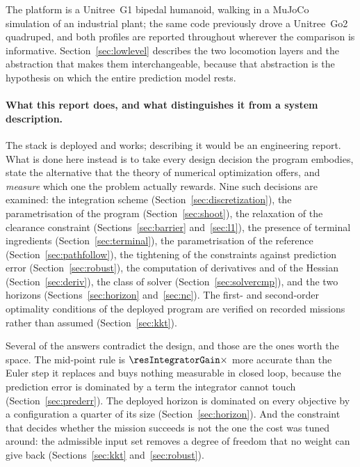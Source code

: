 \documentclass[11pt,a4paper]{article}
\begin{document}
The platform is a Unitree~G1 bipedal humanoid, walking in a MuJoCo simulation of an industrial plant; the same
code previously drove a Unitree~Go2 quadruped, and both profiles are reported throughout wherever the
comparison is informative. Section~\ref{sec:lowlevel} describes the two locomotion layers and the abstraction
that makes them interchangeable, because that abstraction is the hypothesis on which the entire prediction
model rests.

\paragraph{What this report does, and what distinguishes it from a system description.}
The stack is deployed and works; describing it would be an engineering report. What is done here instead is
to take every design decision the program embodies, state the alternative that the theory of numerical
optimization offers, and \emph{measure} which one the problem actually rewards. Nine such decisions are
examined: the integration scheme (Section~\ref{sec:discretization}), the parametrisation of the program
(Section~\ref{sec:shoot}), the relaxation of the clearance constraint (Sections~\ref{sec:barrier}
and~\ref{sec:l1}), the presence of terminal ingredients (Section~\ref{sec:terminal}), the parametrisation of
the reference (Section~\ref{sec:pathfollow}), the tightening of the constraints against prediction error
(Section~\ref{sec:robust}), the computation of derivatives and of the Hessian (Section~\ref{sec:deriv}), the
class of solver (Section~\ref{sec:solvercmp}), and the two horizons (Sections~\ref{sec:horizon}
and~\ref{sec:nc}). The first- and second-order optimality conditions of the deployed program are verified on
recorded missions rather than assumed (Section~\ref{sec:kkt}).

Several of the answers contradict the design, and those are the ones worth the space. The mid-point rule is
$\resIntegratorGain\times$ more accurate than the Euler step it replaces and buys nothing measurable in
closed loop, because the prediction error is dominated by a term the integrator cannot touch
(Section~\ref{sec:prederr}). The deployed horizon is dominated on every objective by a configuration a
quarter of its size (Section~\ref{sec:horizon}). And the constraint that decides whether the mission succeeds
is not the one the cost was tuned around: the admissible input set removes a degree of freedom that no
weight can give back (Sections~\ref{sec:kkt} and~\ref{sec:robust}).
\end{document}

